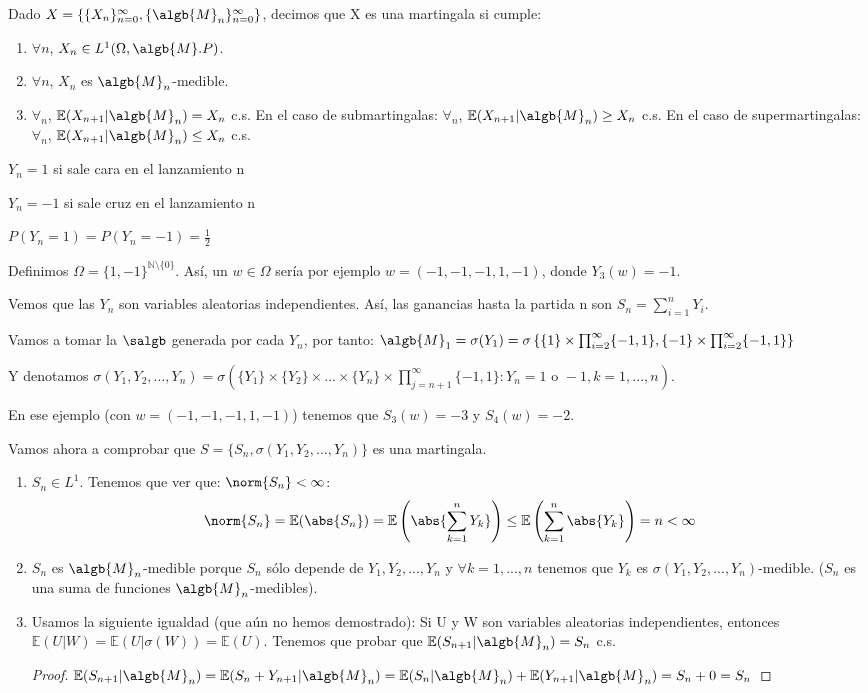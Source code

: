 \documentclass{apuntes}
\begin{document}
\begin{defn}[Martingala]
Dado $X=\{\{X_n\}_{n=0}^{\infty}, \{\algb{M}_n\}_{n=0}^{\infty}\}$, decimos que X es una martingala si cumple:
\begin{enumerate}
\item $\forall n$, $X_n \in L^1(\Omega, \algb{M}. P)$.
\item $\forall n$, $X_n$ es $\algb{M}_n$-medible.
\item $\forall_n$, $\mathbb{E}(X_{n+1}|\algb{M}_n)=X_n$ c.s.
En el caso de submartingalas: $\forall_n$, $\mathbb{E}(X_{n+1}|\algb{M}_n)\geq X_n$ c.s.
En el caso de supermartingalas: $\forall_n$, $\mathbb{E}(X_{n+1}|\algb{M}_n)\leq X_n$ c.s.
\end{enumerate}
\end{defn}

\begin{example}
$Y_n = 1$ si sale cara en el lanzamiento n

$Y_n=-1$ si sale cruz en el lanzamiento n

$P(Y_n=1)=P(Y_n=-1)=\frac{1}{2}$

Definimos $\Omega = \{1,-1\}^{\mathbb{N}\setminus \{0\}}$. Así, un $w \in \Omega$ sería por ejemplo $w=(-1,-1,-1,1,-1)$, donde $Y_3(w)=-1$.

Vemos que las $Y_n$ son variables aleatorias independientes. Así, las ganancias hasta la partida n son $S_n=\sum_{i=1}^{n}Y_i$.

Vamos a tomar la $\salgb$ generada por cada $Y_n$, por tanto: $\algb{M}_1 = \sigma(Y_1)=\sigma\left\{\{1\}\times\prod_{i=2}^{\infty}\{-1,1\},\{-1\}\times\prod_{i=2}^{\infty}\{-1,1\} \right\}$

Y denotamos $\sigma(Y_1, Y_2,...,Y_n)=\sigma(\{Y_1\}\times\{Y_2\}\times ... \times\{Y_n\}\times \prod_{j=n+1}^{\infty}\{-1,1\} : Y_n= 1 \text{ o } -1, k=1,...,n )$.

En ese ejemplo (con $w=(-1,-1,-1,1,-1)$) tenemos que $S_3(w)=-3$ y $S_4(w)=-2$.

Vamos ahora a comprobar que $S=\{S_n, \sigma(Y_1, Y_2,...,Y_n)\}$ es una martingala.
\begin{enumerate}
\item $S_n \in L^1$. Tenemos que ver que: $\norm{S_n} < \infty$:
\[
\norm{S_n}=\mathbb{E}(\abs{S_n})=\mathbb{E}\left(\abs{\sum_{k=1}^{n} Y_k}\right) \leq \mathbb{E}\left(\sum_{k=1}^{n} \abs{Y_k}\right) = n < \infty
\]
\item $S_n$ es $\algb{M}_n$-medible porque $S_n$ sólo depende de $Y_1,Y_2,...,Y_n$ y $\forall k=1,...,n$ tenemos que $Y_k$ es $\sigma(Y_1,Y_2,...,Y_n)$-medible. ($S_n$ es una suma de funciones $\algb{M}_n$-medibles).
\item Usamos la siguiente igualdad (que aún no hemos demostrado): Si U y W son variables aleatorias independientes, entonces $\mathbb{E}(U|W)=\mathbb{E}(U|\sigma(W))=\mathbb{E}(U)$. Tenemos que probar que $\mathbb{E}(S_{n+1}|\algb{M}_n)=S_n$ c.s.
\begin{proof}
$\mathbb{E}(S_{n+1}|\algb{M}_n)= \mathbb{E}(S_{n} + Y_{n+1}|\algb{M}_n) =  \mathbb{E}(S_{n}|\algb{M}_n) + \mathbb{E}(Y_{n+1}|\algb{M}_n) = S_n + 0 = S_n$


\end{proof}
\end{enumerate}
\end{example}
\end{document}
